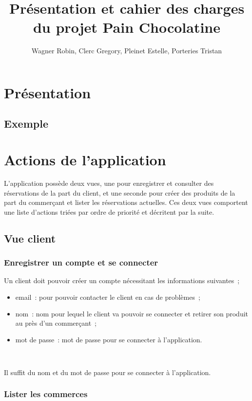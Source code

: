 \documentclass[a4paper,12pt]{article}
\title{Présentation et cahier des charges du projet Pain Chocolatine}
\author{Wagner Robin, Clerc Gregory, Pleinet Estelle, Porteries Tristan}
\begin{document}
\maketitle

\tableofcontents

\section{Présentation}

\subsection{Exemple}

\section{Actions de l'application}

L'application possède deux vues, une pour enregistrer et consulter des réservations de la part du client, et une seconde pour créer des produits de la part du commerçant et lister les réservations actuelles. Ces deux vues comportent une liste d'actions triées par ordre de priorité et décritent par la suite.

\subsection{Vue client}

\subsubsection{Enregistrer un compte et se connecter}

Un client doit pouvoir créer un compte nécessitant les informations suivantes~;
\begin{itemize}
	\item email~: pour pouvoir contacter le client en cas de problèmes~;
	\item nom~: nom pour lequel le client va pouvoir se connecter et retirer son produit au près d'un commerçant~;
	\item mot de passe~: mot de passe pour se connecter à l'application.
\end{itemize} \

Il suffit du nom et du mot de passe pour se connecter à l'application.

\subsubsection{Lister les commerces}
\end{document}
